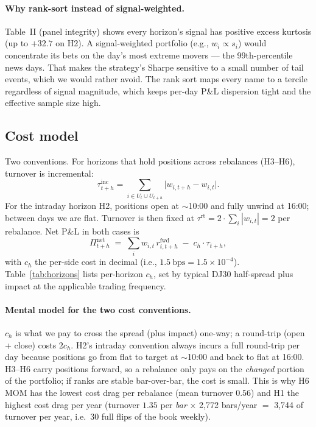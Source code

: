 \documentclass[10pt,conference,compsoc]{IEEEtran}
\begin{document}
\paragraph{Why rank-sort instead of signal-weighted.} Table~II
(panel integrity) shows every horizon's signal has positive excess
kurtosis (up to $+32.7$ on H2). A signal-weighted portfolio
(e.g., $w_i \propto s_i$) would concentrate its bets on the day's
most extreme movers --- the 99th-percentile news days. That makes
the strategy's Sharpe sensitive to a small number of tail events,
which we would rather avoid. The rank sort maps every name to a
tercile regardless of signal magnitude, which keeps per-day P\&L
dispersion tight and the effective sample size high.

\subsection{Cost model}

Two conventions. For horizons that hold positions across rebalances
(H3--H6), turnover is incremental:
\begin{equation}
  \tau_{t+h}^{\text{inc}} =
  \sum_{i \in U_t \cup U_{t+h}} \bigl|w_{i,t+h} - w_{i,t}\bigr|.
  \label{eq:turn}
\end{equation}
For the intraday horizon H2, positions open at $\sim$10:00 and fully
unwind at 16:00; between days we are flat. Turnover is then fixed at
$\tau^{\text{rt}} = 2\cdot\sum_i |w_{i,t}| = 2$ per rebalance. Net
P\&L in both cases is
\begin{equation}
  \Pi^{\text{net}}_{t+h} \;=\;
  \sum_i w_{i,t}\, r_{i,t+h}^{\text{fwd}}
  \;-\; c_h\cdot\tau_{t+h},
  \label{eq:net}
\end{equation}
with $c_h$ the per-side cost in decimal (i.e., $1.5~\text{bps} =
1.5\times10^{-4}$). Table~\ref{tab:horizons} lists per-horizon
$c_h$, set by typical DJ30 half-spread plus impact at the applicable
trading frequency.

\paragraph{Mental model for the two cost conventions.} $c_h$ is
what we pay to cross the spread (plus impact) one-way; a round-trip
(open + close) costs $2c_h$. H2's intraday convention always incurs
a full round-trip per day because positions go from flat to
target at $\sim$10:00 and back to flat at 16:00. H3--H6 carry
positions forward, so a rebalance only pays on the \emph{changed}
portion of the portfolio; if ranks are stable bar-over-bar, the
cost is small. This is why H6 MOM has the lowest cost drag per
rebalance (mean turnover $0.56$) and H1 the highest cost drag per
year (turnover $1.35$ per \emph{bar} $\times$ 2{,}772 bars/year
$=$ 3{,}744 of turnover per year, i.e.\ 30 full flips of the book
weekly).
\end{document}

